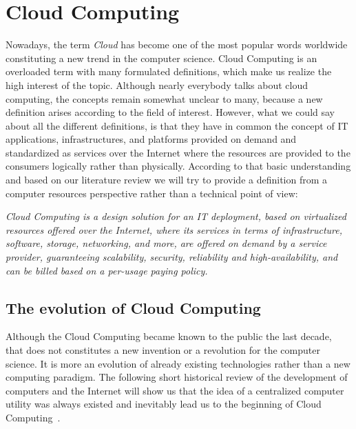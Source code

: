 \section{Cloud Computing}\label{sec:cloud}

Nowadays, the term \emph{Cloud} has become one of the most popular words
worldwide constituting a new trend in the computer science. Cloud Computing is
an overloaded term with many formulated definitions, which make us realize the
high interest of the topic. Although nearly everybody talks about cloud
computing, the concepts remain somewhat unclear to many, because a new
definition arises according to the field of interest. However, what we could say
about all the different definitions, is that they have in common the concept of
IT applications, infrastructures, and platforms provided on demand and
standardized as services over the Internet where the resources are provided to
the consumers logically rather than physically. According to that basic
understanding and based on our literature review we will try to provide a
definition from a computer resources perspective rather than a technical point
of view:

\begin{center}
  \emph{Cloud Computing is a design solution for an IT deployment, based on
        virtualized resources offered over the Internet, where its services in
        terms of infrastructure, software, storage, networking, and more, are
        offered on demand by a service provider, guaranteeing scalability,
        security, reliability and high-availability, and can be billed based on
        a per-usage paying policy.}
\end{center}

\subsection{The evolution of Cloud Computing}

Although the Cloud Computing became known to the public the last decade, that
does not constitutes a new invention or a revolution for the computer science.
It is more an evolution of already existing technologies rather than a new
computing paradigm. The following short historical review of the development of
computers and the Internet will show us that the idea of a centralized computer
utility was always existed and inevitably lead us to the beginning of Cloud
Computing~\cite{cloud_evolution}.

